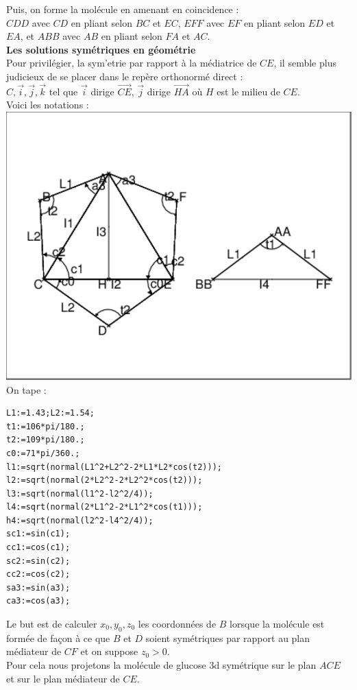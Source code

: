 \documentclass[a4paper,11pt]{book}
\begin{document}
Puis, on forme la mol\'ecule en amenant en coincidence :\\
$CDD$ avec $CD$ en pliant selon $BC$ et $EC$, $EFF$ avec $EF$ en pliant selon 
$ED$ et $EA$, et $ABB$ avec $AB$ en pliant selon $FA$ et $AC$.\\
{\bf Les solutions sym\'etriques en g\'eom\'etrie}\\
Pour privil\'egier, la sym'etrie par rapport \`a la m\'ediatrice de $CE$, il 
semble plus judicieux de se placer dans le rep\`ere orthonorm\'e direct :\\
$C,\overrightarrow{i},\overrightarrow{j},\overrightarrow{k}$ tel que 
$\overrightarrow{i}$ dirige $\overrightarrow{CE}$, $\overrightarrow{j}$ dirige 
$\overrightarrow{HA}$ o\`u $H$ est le milieu de $CE$.\\

Voici les notations :\\
\includegraphics[width=\textwidth]{glucnot}\\
On tape :
\begin{verbatim}
L1:=1.43;L2:=1.54;
t1:=106*pi/180.;
t2:=109*pi/180.;
c0:=71*pi/360.;
l1:=sqrt(normal(L1^2+L2^2-2*L1*L2*cos(t2)));
l2:=sqrt(normal(2*L2^2-2*L2^2*cos(t2)));
l3:=sqrt(normal(l1^2-l2^2/4));
l4:=sqrt(normal(2*L1^2-2*L1^2*cos(t1)));
h4:=sqrt(normal(l2^2-l4^2/4));
sc1:=sin(c1);
cc1:=cos(c1);
sc2:=sin(c2);
cc2:=cos(c2);
sa3:=sin(a3);
ca3:=cos(a3);
\end{verbatim}
Le but est de calculer $x_0,y_0,z_0$ les coordonn\'ees de $B$ lorsque la 
mol\'ecule est form\'ee de fa\c{c}on \`a ce que $B$ et $D$ soient sym\'etriques
par rapport au plan m\'ediateur de $CF$ et on suppose $z_0>0$.\\
Pour cela nous projetons la mol\'ecule de glucose 3d sym\'etrique sur le plan
 $ACE$ et sur le plan m\'ediateur de $CE$.
\end{document}

